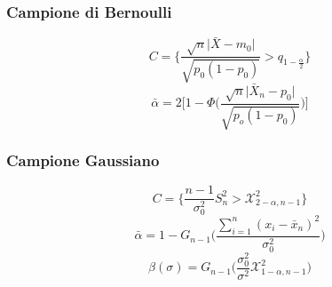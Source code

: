 \subsubsection{Campione di Bernoulli}
\begin{equation}
	C = \bigg\{\frac{\sqrt{n}\lvert \bar{X} - m_0 \rvert}{\sqrt{p_0(1-p_0)}} > q_{1-\frac{\alpha}{2}}\bigg\} 
\end{equation}
\begin{equation}
	\bar{\alpha} =  2 \bigg[1- \Phi\bigg(\frac{\sqrt{n} \lvert\bar{X}_n - p_0 \rvert}{\sqrt{p_o(1-p_0)}}\bigg)\bigg]
\end{equation}
\subsubsection{Campione Gaussiano}
\begin{equation}
	C = \bigg\{\frac{n-1}{\sigma_0^2} S_n^2 > \mathcal{X}^2_{2-\alpha,n-1}\bigg\} 
\end{equation}
\begin{equation}
	\bar{\alpha} =  1-G_{n-1}\bigg(\frac{\sum_{i=1}^{n} (x_i-\bar{x}_n)^2}{\sigma_0^2}\bigg)
\end{equation}
\begin{equation}
	\beta(\sigma)= G_{n-1}\bigg(\frac{\sigma_0^2}{\sigma^2}\mathcal{X}^2_{1-\alpha, n-1}\bigg)
\end{equation}